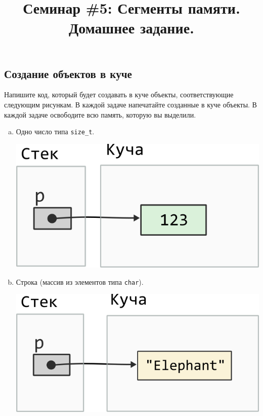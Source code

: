 \documentclass[10pt]{article}
\newcommand{\mallocImagesScale}{0.72}
\begin{document}
\title{Семинар \#5: Сегменты памяти. Домашнее задание.\vspace{-5ex}}\date{}\maketitle
\subsection{Создание объектов в куче}

Напишите код, который будет создавать в куче объекты, соответствующие следующим рисункам. В каждой задаче напечатайте созданные в куче объекты. В каждой задаче освободите всю память, которую вы выделили.
\begin{enumerate}[a.]
\item Одно число типа \texttt{size\_t}.
\begin{center}
\includegraphics[scale=\mallocImagesScale]{../images/malloc_homework/00heap_size_t.png}
\end{center}


\item Строка (массив из элементов типа \texttt{char}).
\begin{center}
\includegraphics[scale=\mallocImagesScale]{../images/malloc_homework/01heap_char_array.png}
\end{center}


\end{enumerate}
\end{document}
